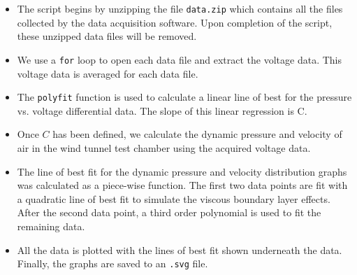 \begin{itemize}
    \item The script begins by unzipping the file \verb|data.zip| which contains all the files collected by the data acquisition software. Upon completion of the script, these unzipped data files will be removed.
    \item We use a \verb|for| loop to open each data file and extract the voltage data. This voltage data is averaged for each data file.
    \item The \verb|polyfit| function is used to calculate a linear line of best for the pressure vs. voltage differential data. The slope of this linear regression is \gls{C}.
    \item Once $C$ has been defined, we calculate the dynamic pressure and velocity of air in the wind tunnel test chamber using the acquired voltage data.
    \item The line of best fit for the dynamic pressure and velocity distribution graphs was calculated as a piece-wise function. The first two data points are fit with a quadratic line of best fit to simulate the viscous boundary layer effects. After the second data point, a third order polynomial is used to fit the remaining data.
    \item All the data is plotted with the lines of best fit shown underneath the data. Finally, the graphs are saved to an \verb|.svg| file.
\end{itemize}
